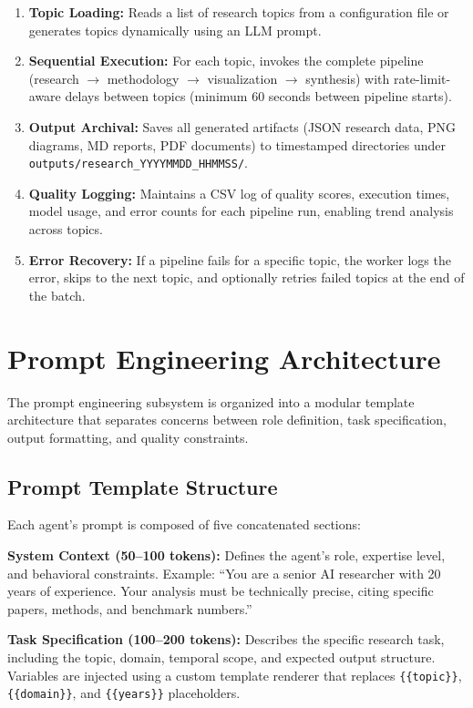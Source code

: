 \documentclass[a4paper,12pt,openany]{report}
\begin{document}
\begin{enumerate}[label=\arabic*., leftmargin=2cm]
\item \textbf{Topic Loading:} Reads a list of research topics from a configuration file or generates topics dynamically using an LLM prompt.
\item \textbf{Sequential Execution:} For each topic, invokes the complete pipeline (research $\rightarrow$ methodology $\rightarrow$ visualization $\rightarrow$ synthesis) with rate-limit-aware delays between topics (minimum 60 seconds between pipeline starts).
\item \textbf{Output Archival:} Saves all generated artifacts (JSON research data, PNG diagrams, MD reports, PDF documents) to timestamped directories under \texttt{outputs/research\_YYYYMMDD\_HHMMSS/}.
\item \textbf{Quality Logging:} Maintains a CSV log of quality scores, execution times, model usage, and error counts for each pipeline run, enabling trend analysis across topics.
\item \textbf{Error Recovery:} If a pipeline fails for a specific topic, the worker logs the error, skips to the next topic, and optionally retries failed topics at the end of the batch.
\end{enumerate}

\section{Prompt Engineering Architecture}

The prompt engineering subsystem is organized into a modular template architecture that separates concerns between role definition, task specification, output formatting, and quality constraints.

\subsection{Prompt Template Structure}

Each agent's prompt is composed of five concatenated sections:

\textbf{System Context (50--100 tokens):} Defines the agent's role, expertise level, and behavioral constraints. Example: ``You are a senior AI researcher with 20 years of experience. Your analysis must be technically precise, citing specific papers, methods, and benchmark numbers.''

\textbf{Task Specification (100--200 tokens):} Describes the specific research task, including the topic, domain, temporal scope, and expected output structure. Variables are injected using a custom template renderer that replaces \texttt{\{\{topic\}\}}, \texttt{\{\{domain\}\}}, and \texttt{\{\{years\}\}} placeholders.
\end{document}
